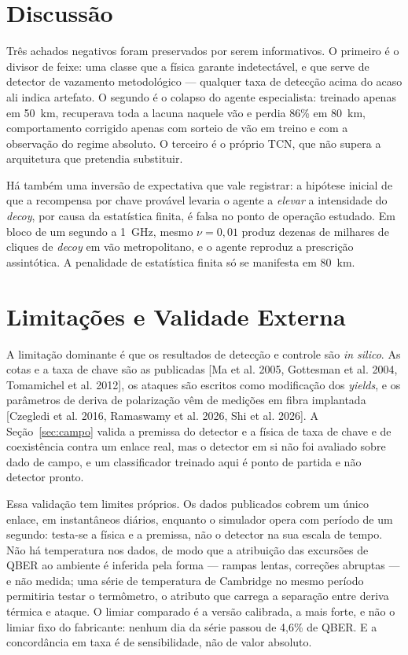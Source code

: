 \documentclass[12pt]{article}
\begin{document}
\section{Discussão}

Três achados negativos foram preservados por serem informativos. O primeiro é o
divisor de feixe: uma classe que a física garante indetectável, e que serve de
detector de vazamento metodológico --- qualquer taxa de detecção acima do acaso
ali indica artefato. O segundo é o colapso do agente especialista: treinado
apenas em 50~km, recuperava toda a lacuna naquele vão e perdia 86\% em 80~km,
comportamento corrigido apenas com sorteio de vão em treino e com a observação do
regime absoluto. O terceiro é o próprio TCN, que não supera a arquitetura que
pretendia substituir.

Há também uma inversão de expectativa que vale registrar: a hipótese inicial de
que a recompensa por chave provável levaria o agente a \emph{elevar} a intensidade
do \emph{decoy}, por causa da estatística finita, é falsa no ponto de operação
estudado. Em bloco de um segundo a 1~GHz, mesmo $\nu = 0{,}01$ produz dezenas de
milhares de cliques de \emph{decoy} em vão metropolitano, e o agente reproduz a
prescrição assintótica. A penalidade de estatística finita só se manifesta em
80~km.

\section{Limitações e Validade Externa}

A limitação dominante é que os resultados de detecção e controle são \emph{in
silico}. As cotas e a taxa de chave são as publicadas [Ma et al. 2005, Gottesman
et al. 2004, Tomamichel et al. 2012], os ataques são escritos como modificação dos
\emph{yields}, e os parâmetros de deriva de polarização vêm de medições em fibra
implantada [Czegledi et al. 2016, Ramaswamy et al. 2026, Shi et al. 2026]. A
Seção~\ref{sec:campo} valida a premissa do detector e a física de taxa de chave e
de coexistência contra um enlace real, mas o detector em si não foi avaliado sobre
dado de campo, e um classificador treinado aqui é ponto de partida e não detector
pronto.

Essa validação tem limites próprios. Os dados publicados cobrem um único enlace,
em instantâneos diários, enquanto o simulador opera com período de um segundo:
testa-se a física e a premissa, não o detector na sua escala de tempo. Não há
temperatura nos dados, de modo que a atribuição das excursões de QBER ao ambiente
é inferida pela forma --- rampas lentas, correções abruptas --- e não medida; uma
série de temperatura de Cambridge no mesmo período permitiria testar o termômetro,
o atributo que carrega a separação entre deriva térmica e ataque. O limiar
comparado é a versão calibrada, a mais forte, e não o limiar fixo do fabricante:
nenhum dia da série passou de 4,6\% de QBER. E a concordância em taxa é de
sensibilidade, não de valor absoluto.
\end{document}
